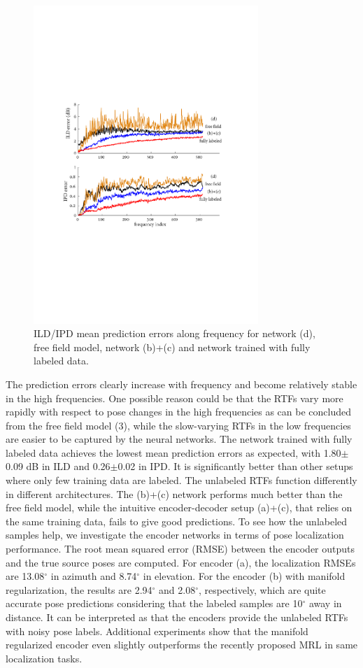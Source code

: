 \documentclass{article}
\begin{document}
\begin{figure}[tb]
    \centering
    \centerline{\includegraphics[width=8.5cm]{fig3_err_freq.pdf}}
    \caption{ILD/IPD mean prediction errors along frequency for network (d), free field model, network (b)+(c) and network trained with fully labeled data.}
    \label{fig3}
\end{figure}

The prediction errors clearly increase with frequency and become relatively stable in the high frequencies. One possible reason could be that the RTFs vary more rapidly with respect to pose changes in the high frequencies as can be concluded from the free field model (3), while the slow-varying RTFs in the low frequencies are easier to be captured by the neural networks. The network trained with fully labeled data achieves the lowest mean prediction errors as expected, with 1.80$\pm$0.09 dB in ILD and 0.26$\pm$0.02 in IPD. It is significantly better than other setups where only few training data are labeled. The unlabeled RTFs function differently in different architectures. The (b)+(c) network performs much better than the free field model, while the intuitive encoder-decoder setup (a)+(c), that relies on the same training data, fails to give good predictions. To see how the unlabeled samples help, we investigate the encoder networks in terms of pose localization performance. The root mean squared error (RMSE) between the encoder outputs and the true source poses are computed. For encoder (a), the localization RMSEs are 13.08$^{\circ}$ in azimuth and 8.74$^{\circ}$ in elevation. For the encoder (b) with manifold regularization, the results are 2.94$^{\circ}$ and 2.08$^{\circ}$, respectively, which are quite accurate pose predictions considering that the labeled samples are 10$^{\circ}$ away in distance. It can be interpreted as that the encoders provide the unlabeled RTFs with noisy pose labels. Additional experiments show that the manifold regularized encoder even slightly outperforms the recently proposed MRL in same localization tasks.
\end{document}
